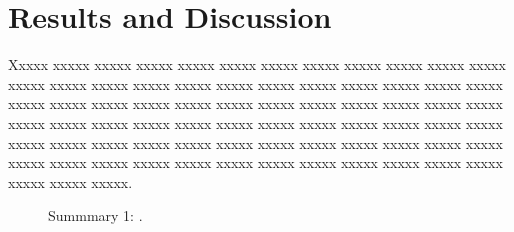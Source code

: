 \documentclass[conference]{IEEEtran}
\begin{document}
\section{Results and Discussion}
\label{sec:results_and_discussion}
Xxxxx xxxxx xxxxx  xxxxx  xxxxx  xxxxx  xxxxx  xxxxx  xxxxx  xxxxx  xxxxx  xxxxx  xxxxx  xxxxx  xxxxx  xxxxx  xxxxx  xxxxx  xxxxx  xxxxx  xxxxx  xxxxx  xxxxx  xxxxx  xxxxx  xxxxx  xxxxx  xxxxx  xxxxx  xxxxx  xxxxx  xxxxx  xxxxx  xxxxx  xxxxx  xxxxx  xxxxx  xxxxx  xxxxx  xxxxx  xxxxx  xxxxx  xxxxx  xxxxx  xxxxx  xxxxx  xxxxx  xxxxx  xxxxx  xxxxx  xxxxx  xxxxx  xxxxx  xxxxx  xxxxx  xxxxx  xxxxx  xxxxx  xxxxx  xxxxx  xxxxx  xxxxx  xxxxx  xxxxx  xxxxx  xxxxx  xxxxx  xxxxx  xxxxx  xxxxx  xxxxx  xxxxx  xxxxx  xxxxx  xxxxx.


\begin{figure}%
%
\caption{Summmary 1: .}
\label{fig:results_and_discussion:summarisation_models:summary1}
\end{figure}
\end{document}
